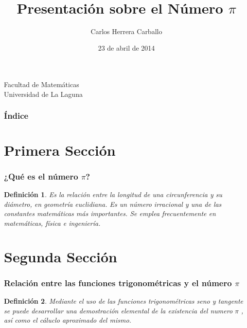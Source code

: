 \documentclass{beamer}
\title[Presentación sobre el Número $\pi$]{Presentación sobre el Número $\pi$ }
\author[Carlos Herrera Carballo]{Carlos Herrera Carballo}
\date[23-04-2014]{23 de abril de 2014}
\newtheorem{definicion}{Definición}
\begin{document}
  
\begin{frame}

  
  \titlepage

  \begin{small}
    \begin{center}
     Facultad de Matemáticas \\
     Universidad de La Laguna
    \end{center}
  \end{small}

\end{frame}

\begin{frame}
  \frametitle{Índice}
  \tableofcontents[pausesections]
\end{frame}


\section{Primera Sección}


\begin{frame}

\frametitle{¿Qué es el número $\pi$?}

\begin{definicion}
Es la relación entre la longitud de una circunferencia y su diámetro, en geometría euclidiana. Es un número irracional y una de las constantes matemáticas más importantes. Se emplea frecuentemente en matemáticas, física e ingeniería.
\end{definicion}

\end{frame}

\section{Segunda Sección}

\begin{frame}

\frametitle{Relación entre las funciones trigonométricas y el número $\pi$}

\begin{definicion}
Mediante el uso de las funciones trigonométricas seno y tangente se puede desarrollar una  demostración elemental de la existencia del numero $\pi$ , así como el cáluclo aproximado del mismo.
\end{definicion}

\end{frame}
\end{document}
